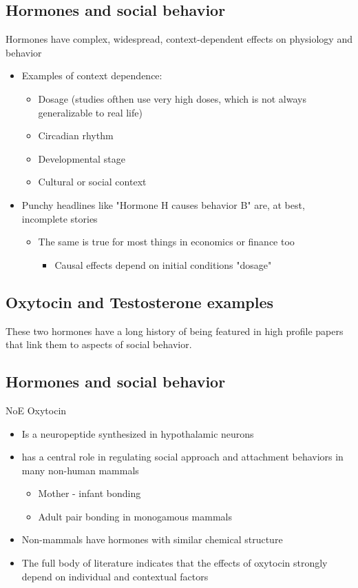 \subsection{Hormones and social behavior}
Hormones have complex, widespread, context-dependent effects on physiology and behavior
\begin{itemize}
    \item Examples of context dependence:
    \begin{itemize}
        \item Dosage (studies ofthen use very high doses, which is not always generalizable to real life)
        \item Circadian rhythm
        \item Developmental stage
        \item Cultural or social context
    \end{itemize}
    \item Punchy headlines like "Hormone H causes behavior B" are, at best, incomplete stories
    \begin{itemize}
        \item The same is true for most things in economics or finance too
        \begin{itemize}
            \item Causal effects depend on initial conditions "dosage"
        \end{itemize}
    \end{itemize}
\end{itemize}

\subsection{Oxytocin and Testosterone examples}
These two hormones have a long history of being featured in high profile papers that link them to aspects of social behavior.
\subsection{Hormones and social behavior}
NoE
Oxytocin
\begin{itemize}
    \item Is a neuropeptide synthesized in hypothalamic neurons
    \item has a central role in regulating social approach and attachment behaviors in many non-human mammals
    \begin{itemize}
        \item Mother - infant bonding
        \item Adult pair bonding in monogamous mammals
    \end{itemize}
    \item Non-mammals have hormones with similar chemical structure
    \item The full body of literature indicates that the effects of oxytocin strongly depend on individual and contextual factors
\end{itemize}

